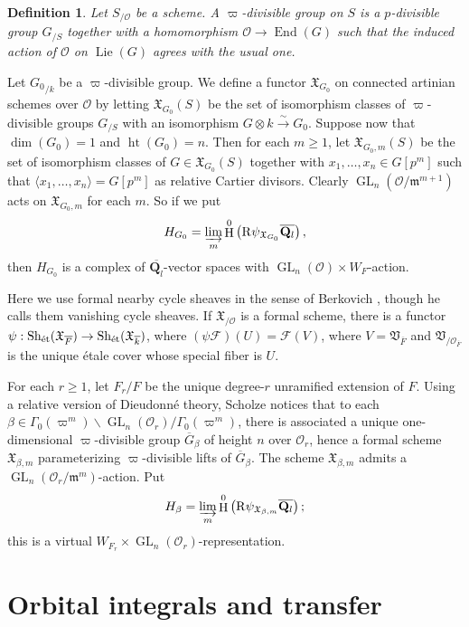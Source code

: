 \documentclass{article}
\DeclareMathOperator{\End}{End}
\DeclareMathOperator{\GL}{GL}
\DeclareMathOperator{\h}{H}
\DeclareMathOperator{\height}{ht}
\DeclareMathOperator{\lie}{Lie}
\DeclareMathOperator{\sheaves}{Sh}
\newcommand{\etale}{\textnormal{\'et}}
\newcommand{\iso}{\xrightarrow\sim}
\newcommand{\cO}{\mathcal{O}}
\newcommand{\dQ}{\mathbf{Q}}
\newcommand{\eR}{\mathrm{R}}
\newcommand{\fm}{\mathfrak{m}}
\newcommand{\fV}{\mathfrak{V}}
\newcommand{\fX}{\mathfrak{X}}
\newcommand{\sF}{\mathscr{F}}
\newtheorem{definition}[subsection]{Definition}
\begin{document}
\begin{definition}
Let $S_{/\cO}$ be a scheme. A \emph{$\varpi$-divisible group} on $S$ is a 
$p$-divisible group $G_{/S}$ together with a homomorphism 
$\cO\to \End(G)$ such that the induced action of $\cO$ on $\lie(G)$ agrees 
with the usual one. 
\end{definition}

Let ${G_0}_{/k}$ be a $\varpi$-divisible group. We define a functor 
$\fX_{G_0}$ on connected artinian schemes over $\cO$ by letting 
$\fX_{G_0}(S)$ be the set of isomorphism classes of $\varpi$-divisible 
groups $G_{/S}$ with an isomorphism $G\otimes k\iso G_0$. Suppose now that 
$\dim(G_0)=1$ and $\height(G_0)=n$. Then for each 
$m\geqslant 1$, let $\fX_{G_0,m}(S)$ be the set of isomorphism classes of 
$G\in \fX_{G_0}(S)$ together with $x_1,\dots,x_n\in G[p^m]$ such that 
$\langle x_1,\dots,x_n\rangle = G[p^m]$ as relative Cartier divisors. 
Clearly $\GL_n(\cO/\fm^{m+1})$ acts on $\fX_{G_0,m}$ for each $m$. So if 
we put 
\[
  H_{G_0} = \varinjlim_m \h^0\left(\eR \psi_{\fX_{G_0}}\overline{\dQ_l}\right) ,
\]
then $H_{G_0}$ is a complex of $\overline{\dQ_l}$-vector spaces with 
$\GL_n(\cO)\times W_F$-action. 

Here we use formal nearby cycle sheaves in the sense of Berkovich 
\cite{berkovich-1996}, though he calls them vanishing cycle sheaves. If 
$\fX_{/\cO}$ is a formal scheme, there is a functor 
$\psi:\sheaves_\etale(\fX_{\overline F}) \to \sheaves_\etale(\fX_{\overline k})$, 
where $(\psi \sF)(U)=\sF(V)$, where $V=\fV_{\overline F}$ and 
$\fV_{/\cO_{\overline F}}$ is the unique \'etale cover whose special fiber is 
$U$. 

For each $r\geqslant 1$, let $F_r/F$ be the unique degree-$r$ unramified 
extension of $F$. Using a relative version of Dieudonn\'e theory, Scholze 
notices that to each 
$\beta\in \Gamma_0(\varpi^m)\backslash \GL_n(\cO_r)/\Gamma_0(\varpi^m)$, 
there is associated a unique one-dimensional $\varpi$-divisible group 
$\overline G_\beta$ of height $n$ over $\cO_r$, 
hence a formal scheme $\fX_{\beta,m}$ parameterizing $\varpi$-divisible 
lifts of $\overline G_\beta$. The scheme $\fX_{\beta,m}$ admits a 
$\GL_n(\cO_r/\fm^m)$-action. Put 
\[
  H_\beta = \varinjlim_m \h^0\left(\eR \psi_{\fX_{\beta,m}} \overline{\dQ_l}\right) ;
\]
this is a virtual $ W_{F_r}\times\GL_n(\cO_r)$-representation. 





\section{Orbital integrals and transfer}
\end{document}
